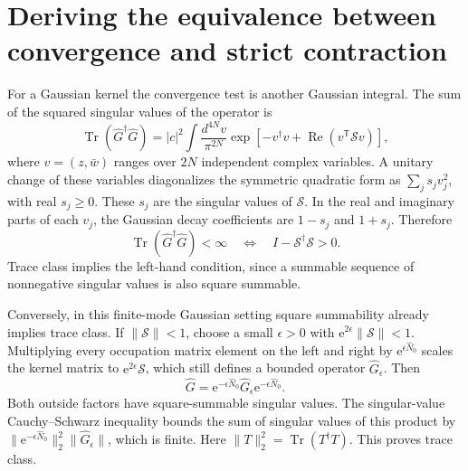 \documentclass[11pt,a4paper]{article}
\newcommand{\Tr}{\operatorname{Tr}}
\newcommand{\ee}{\mathrm e}
\newcommand{\trans}{\mathsf T}
\numberwithin{equation}{section}
\begin{document}
\section{Deriving the equivalence between convergence and strict contraction}
\label{app:convergence}

For a Gaussian kernel the convergence test is another Gaussian integral.
The sum of the squared singular values of the operator is
\begin{equation}
 \Tr(\hat G^\dagger\hat G)
 =|c|^2\int\frac{d^{4N}v}{\pi^{2N}}
 \exp\!\left[-v^\dagger v+\operatorname{Re}(v^\trans\mathcal Sv)\right],
 \label{eq:kernel_norm_integral}
\end{equation}
where $v=(z,\bar w)$ ranges over $2N$ independent complex variables.
A unitary change of these variables diagonalizes the symmetric quadratic
form as $\sum_js_jv_j^2$, with real $s_j\geq0$. These $s_j$ are the
singular values of $\mathcal S$. In the real and imaginary parts of each
$v_j$, the Gaussian decay coefficients are $1-s_j$ and $1+s_j$.
Therefore
\begin{equation}
 \Tr(\hat G^\dagger\hat G)<\infty
 \quad\Longleftrightarrow\quad
 I-\mathcal S^\dagger\mathcal S>0.
 \label{eq:kernel_norm_test}
\end{equation}
Trace class implies the left-hand condition, since a summable sequence of
nonnegative singular values is also square summable.

Conversely, in this finite-mode Gaussian setting square summability already
implies trace class. If $\|\mathcal S\|<1$, choose a small $\epsilon>0$
with $\ee^{2\epsilon}\|\mathcal S\|<1$. Multiplying every occupation
matrix element on the left and right by $\ee^{\epsilon\hat N_0}$ scales
the kernel matrix to $\ee^{2\epsilon}\mathcal S$, which still defines a
bounded operator $\hat G_\epsilon$. Then
\begin{equation}
 \hat G=\ee^{-\epsilon\hat N_0}\hat G_\epsilon
        \ee^{-\epsilon\hat N_0}.
 \label{eq:traceclass_sandwich}
\end{equation}
Both outside factors have square-summable singular values. The singular-value
Cauchy--Schwarz inequality bounds the sum of singular values of this product
by $\|\ee^{-\epsilon\hat N_0}\|_2^2\|\hat G_\epsilon\|$, which is
finite. Here $\|T\|_2^2=\Tr(T^\dagger T)$. This proves trace class.
\end{document}

